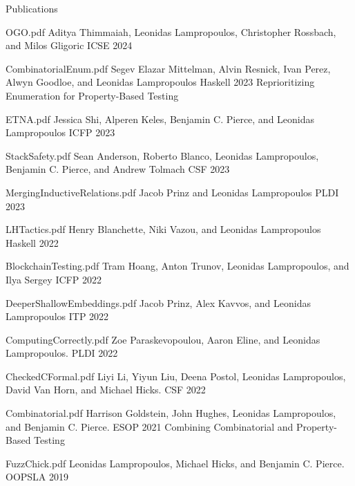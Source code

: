 \documentclass{resume} %
\begin{document}
\begin{rSection}{Publications}

    {OGO.pdf}
    {Aditya Thimmaiah, Leonidas Lampropoulos, Christopher Rossbach, and Milos Gligoric}
    {ICSE 2024}

    {CombinatorialEnum.pdf}
    {Segev Elazar Mittelman, Alvin Resnick, Ivan Perez, Alwyn Goodloe, and Leonidas Lampropoulos}
    {Haskell 2023}
    {Reprioritizing Enumeration for Property-Based Testing}
    
    {ETNA.pdf}
    {Jessica Shi, Alperen Keles, Benjamin C. Pierce, and Leonidas Lampropoulos}
    {ICFP 2023}

    {StackSafety.pdf}
    {Sean Anderson, Roberto Blanco, Leonidas Lampropoulos, Benjamin C. Pierce, and Andrew Tolmach}
    {CSF 2023}
  
    {MergingInductiveRelations.pdf}
    {Jacob Prinz and Leonidas Lampropoulos}
    {PLDI 2023}
  
    {LHTactics.pdf}
    {Henry Blanchette, Niki Vazou, and Leonidas Lampropoulos}
    {Haskell 2022}
  
    {BlockchainTesting.pdf}
    {Tram Hoang, Anton Trunov, Leonidas Lampropoulos, and Ilya Sergey}
    {ICFP 2022}
  
    {DeeperShallowEmbeddings.pdf}
    {Jacob Prinz, Alex Kavvos, and Leonidas Lampropoulos}
    {ITP 2022}
  
    {ComputingCorrectly.pdf}
    {Zoe Paraskevopoulou, Aaron Eline, and Leonidas Lampropoulos.}
    {PLDI 2022}
  
    {CheckedCFormal.pdf}
    {Liyi Li, Yiyun Liu, Deena Postol, Leonidas Lampropoulos, David Van Horn, and Michael Hicks.}
    {CSF 2022}

    {Combinatorial.pdf}
    {Harrison Goldstein, John Hughes, Leonidas Lampropoulos, and Benjamin C. Pierce.}
    {ESOP 2021}
    {Combining Combinatorial and Property-Based Testing}    
    
    {FuzzChick.pdf}
    {Leonidas Lampropoulos, Michael Hicks, and Benjamin C. Pierce.}
    {OOPSLA 2019}
    

\end{rSection}
\end{document}
